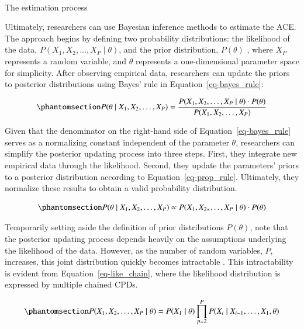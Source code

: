 \documentclass[
  authoryear,
  review,
  1p]{elsarticle}
\makeatletter
\let\oldparagraph\paragraph
\renewcommand{\paragraph}{
    \@ifstar
      \xxxParagraphStar
      \xxxParagraphNoStar
  }
\newcommand{\xxxParagraphStar}[1]{\oldparagraph*{#1}\mbox{}}
\newcommand{\xxxParagraphNoStar}[1]{\oldparagraph{#1}\mbox{}}
\makeatother
\begin{document}
\paragraph{The estimation process}\label{sec-appendixB34}

Ultimately, researchers can use Bayesian inference methods to estimate
the ACE. The approach begins by defining two probability distributions:
the likelihood of the data,
\(P(X_{1}, X_{2}, \dots, X_{P} \mid \theta)\), and the prior
distribution, \(P(\theta)\) \citep{Everitt_et_al_2010}, where \(X_{P}\)
represents a random variable, and \(\theta\) represents a
one-dimensional parameter space for simplicity. After observing
empirical data, researchers can update the priors to posterior
distributions using Bayes' rule in Equation~\ref{eq-bayes_rule}:

\begin{equation}\phantomsection\label{eq-bayes_rule}{
P(\theta \mid X_{1}, X_{2}, \dots, X_{P}) = \frac{P(X_{1}, X_{2}, \dots, X_{P} \mid \theta) \cdot P(\theta)}{P(X_{1}, X_{2}, \dots, X_{P})}
}\end{equation}

Given that the denominator on the right-hand side of
Equation~\ref{eq-bayes_rule} serves as a normalizing constant
independent of the parameter \(\theta\), researchers can simplify the
posterior updating process into three steps. First, they integrate new
empirical data through the likelihood. Second, they update the
parameters' priors to a posterior distribution according to
Equation~\ref{eq-prop_rule}. Ultimately, they normalize these results to
obtain a valid probability distribution.

\begin{equation}\phantomsection\label{eq-prop_rule}{
P(\theta \mid X_{1}, X_{2}, \dots, X_{P}) \propto P(X_{1}, X_{2}, \dots, X_{P}\mid \theta) \cdot P(\theta)
}\end{equation}

Temporarily setting aside the definition of prior distributions
\(P(\theta)\), note that the posterior updating process depends heavily
on the assumptions underlying the likelihood of the data. However, as
the number of random variables, \(P\), increases, this joint
distribution quickly becomes intractable \citep{Neal_2020}. This
intractability is evident from Equation~\ref{eq-like_chain}, where the
likelihood distribution is expressed by multiple chained CPDs.

\begin{equation}\phantomsection\label{eq-like_chain}{
P(X_{1}, X_{2}, \dots, X_{P} \mid \theta) = P(X_{1} \mid \theta) \prod^{P}_{p=2} P(X_{i} \mid X_{i-1}, \dots, X_{1}, \theta )
}\end{equation}
\end{document}
